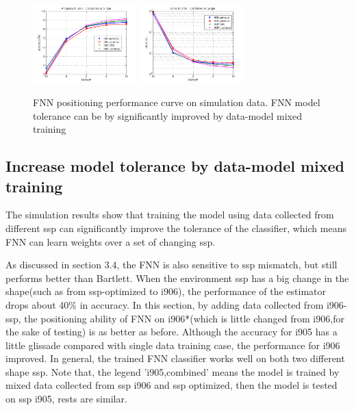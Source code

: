 \begin{figure}
\includegraphics[width=4cm,height=3cm]{figure/Accuracy_to_SNR_Combined_vs_Single}
\includegraphics[width=4cm,height=3cm]{figure/Error_to_SNR_Combined_vs_Single}
\caption{FNN positioning performance curve on simulation data. FNN model tolerance can be by significantly improved by data-model mixed training}
\end{figure}

\subsection{%
Increase model tolerance by data-model mixed training}
The simulation results show that training the model using data collected from different ssp can significantly improve the tolerance of the classifier, which means FNN can learn weights over a set of changing ssp.


As discussed in section 3.4, the FNN is also sensitive to ssp mismatch, but still performs better than Bartlett. When the environment ssp has a big change in the shape(such as from ssp-optimized to i906), the performance of the estimator drops about 40\% in accuracy. In this section, by adding data collected from i906-ssp, the positioning ability of FNN on i906{*}(which is little changed from i906,for the sake of testing) is as better as before. Although the accuracy for i905 has a little glissade compared with single data training case, the performance for i906 improved. In general, the trained FNN classifier works well on both two different shape ssp. Note that, the legend 'i905,combined' means the model is trained by mixed data collected from ssp i906 and ssp optimized, then the model is tested on ssp i905, rests are similar.


